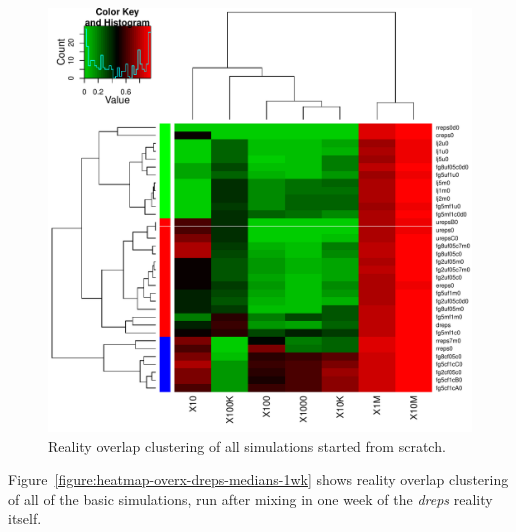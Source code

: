 \documentclass[10pt,oneside]{memoir}
\begin{document}
\begin{figure}
\begin{center}
    \includegraphics{figures/heatmap-overx-dreps-medians-0wk}
    \caption{Reality overlap clustering of all simulations started from scratch.}
    \label{figure:heatmap-overx-dreps-medians-0wk}
\end{center}
\end{figure}
Figure~\ref{figure:heatmap-overx-dreps-medians-1wk} shows reality overlap clustering of all of the basic simulations, run after mixing in one week of the {\itshape dreps} reality itself.
\end{document}

